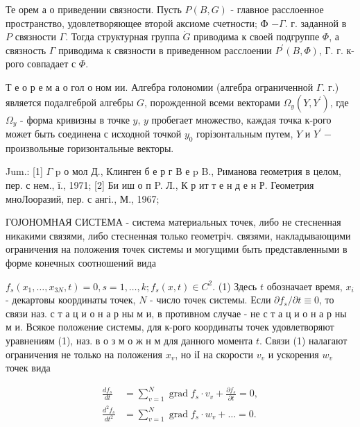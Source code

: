 \documentclass[10pt]{article}
\begin{document}
Те орем а о приведении связности. Пусть $P(B, G)$ - главное расслоенное пространство, удовлетворяющее второй аксиоме счетности; Ф $-\Gamma$. г. заданной в $P$ связности $\Gamma$. Тогда структурная группа $\dot{G}$ приводима к своей подгруппе $\Phi$, а связность $\Gamma$ приводима к связности в приведенном расслоении $P^{\prime}(B, \Phi)$, Г. г. к-рого совпадает с $\Phi$.



Т е о р е м а о гол о ном ии. Алгебра голономии (алгебра ограниченной $\Gamma$. г.) является подалгеброй алгебры $G$, порожденной всеми векторами $\Omega_{y}\left(Y, Y^{\prime}\right)$, где $\Omega_{y}$ - форма кривизны в точке $y$, $y$ пробегает множество, каждая точка к-рого может быть соединена с исходной точкой $y_{0}$ горізонтальным путем, $Y$ и $Y^{\prime}-$ произвольные горизонтальные векторы.



Jum.: [1] $\Gamma$ p о мол Д., Клинген б е р г В е p B., Риманова геометрия в целом, пер. с нем., ї., 1971; [2] Би иш о п P. Л., К р ит т е н д е н Р. Геометрия мноЛооразий, пер. с ангі., М., 1967;



ГОЈОНОМНАЯ СИСТЕМА - система материальных точек, либо не стесненная никакими связями, либо стесненная только геометріч. связями, накладывающими ограничения на положения точек системы и могущими быть представленными в форме конечных соотношений вида



$f_{s}\left(x_{1}, \ldots, x_{3 N}, t\right)=0, s=1, \ldots, k ; f_{s}(x, t) \in C^{2}$. (1) Здесь $t$ обозначает время, $x_{i}$ - декартовы координаты точек, $N$ - число точек системы. Если $\partial f_{s} / \partial t \equiv 0$, то связи наз. с т а ц и о н а р ны м и, в противном случае - не с т а ц и о н а р ны м и. Всякое положение системы, для к-рого координаты точек удовлетворяют уравнениям (1), наз. в о з м о ж н м для данного момента $t$. Связи (1) налагают ограничения не только на положения $x_{v}$, но іІ на скорости $v_{v}$ и ускорения $w_{v}$ точек вида



\[

\begin{aligned}

\frac{d f_{s}}{d t} & =\sum_{v=1}^{N} \operatorname{grad} f_{s} \cdot v_{v}+\frac{\partial f_{s}}{\partial t}=0, \\

\frac{d^{2} f_{s}}{d t^{2}} & =\sum_{v=1}^{N} \operatorname{grad} f_{s} \cdot w_{v}+\ldots=0 .

\end{aligned}

\]
\end{document}
